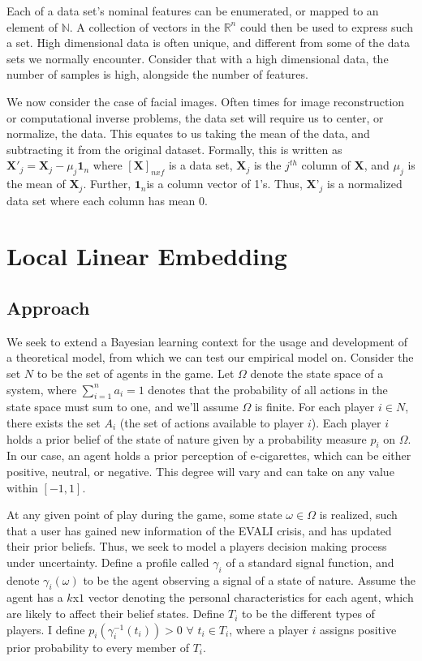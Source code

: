 \documentclass[12pt]{article}
\begin{document}
Each of a data set's nominal features can be enumerated, or mapped to an element of $\mathbb{N}$. A collection of vectors in the $\mathbb{R}^n$ could then be used to express such a set. High dimensional data is often unique, and different from some of the data sets we normally encounter. Consider that with a high dimensional data, the number of samples is high, alongside the number of features.

We now consider the case of facial images. Often times for image reconstruction or computational inverse problems, the data set will require us to center, or normalize, the data. This equates to us taking the mean of the data, and subtracting it from the original dataset. Formally, this is written as $\textbf{X}'_j=\textbf{X}_j-\mu_j\textbf{1}_n$ where $[\textbf{X}]_{n x f}$ is a data set, $\textbf{X}_j$ is the $j^{th}$ column of $\textbf{X}$, and $\mu_j$ is the mean of $\textbf{X}_j$. Further, $\textbf{1}_n$is a column vector of 1's. Thus, $\textbf{X'}_j$ is a normalized data set where each column has mean 0.



\section{Local Linear Embedding} \label{sec:Local Linear Embedding}


\subsection{Approach}
\hspace{5mm}We seek to extend a Bayesian learning context for the usage and development of a theoretical model, from which we can test our empirical model on. Consider the set $N$ to be the set of agents in the game. Let $\Omega$ denote the state space of a system, where $\sum\limits_{i=1}^{n}a_i=1$ denotes that the probability of all actions in the state space must sum to one, and we'll assume $\Omega$ is finite. For each player $i\in N$, there exists the set $A_i$ (the set of actions available to player $i$). Each player $i$ holds a prior belief of the state of nature given by a probability measure $p_i$ on $\Omega$. In our case, an agent holds a prior perception of e-cigarettes, which can be either positive, neutral, or negative. This degree will vary and can take on any value within $[-1,1]$. 

At any given point of play during the game, some state $\omega\in\Omega$ is realized, such that a user has gained new information of the EVALI crisis, and has updated their prior beliefs. Thus, we seek to model a players decision making process under uncertainty. Define a profile called $\gamma_i$ of a standard signal function, and denote $\gamma_i(\omega)$ to be the agent observing a signal of a state of nature. Assume the agent has a $k$x$1$ vector denoting the personal characteristics for each agent, which are likely to affect their belief states. Define $T_i$ to be the different types of players. I define $p_i(\gamma_i^{-1}(t_i))>0$ $\forall$ $t_i\in T_i$, where a player $i$ assigns positive prior probability to every member of $T_i$.
\end{document}
